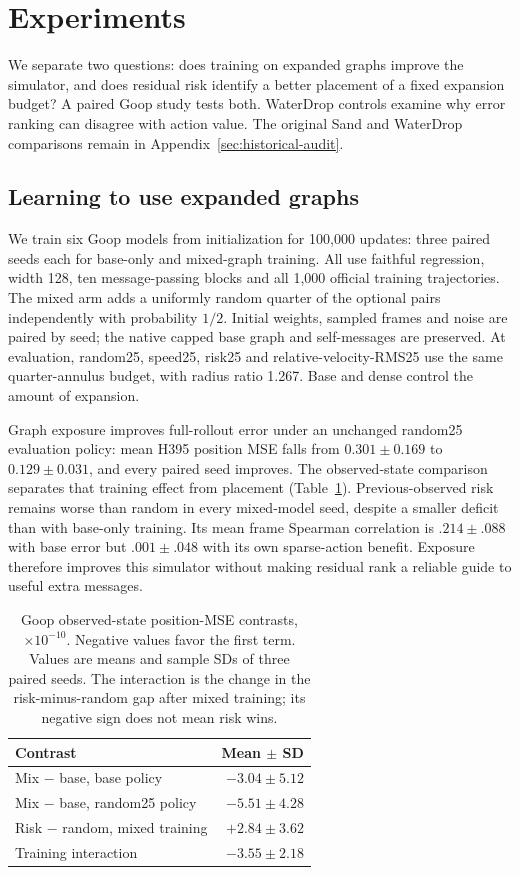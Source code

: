 \section{Experiments}
We separate two questions: does training on expanded graphs improve the simulator, and does residual risk identify a better placement of a fixed expansion budget? A paired Goop study tests both. WaterDrop controls examine why error ranking can disagree with action value. The original Sand and WaterDrop comparisons remain in Appendix~\ref{sec:historical-audit}.

\subsection{Learning to use expanded graphs}
We train six Goop models from initialization for 100,000 updates: three paired seeds each for base-only and mixed-graph training. All use faithful regression, width 128, ten message-passing blocks and all 1,000 official training trajectories. The mixed arm adds a uniformly random quarter of the optional pairs independently with probability $1/2$. Initial weights, sampled frames and noise are paired by seed; the native capped base graph and self-messages are preserved. At evaluation, random25, speed25, risk25 and relative-velocity-RMS25 use the same quarter-annulus budget, with radius ratio 1.267. Base and dense control the amount of expansion.

Graph exposure improves full-rollout error under an unchanged random25 evaluation policy: mean H395 position MSE falls from $0.301\pm0.169$ to $0.129\pm0.031$, and every paired seed improves. The observed-state comparison separates that training effect from placement (Table~\ref{tab:goop-exposure-placement}). Previous-observed risk remains worse than random in every mixed-model seed, despite a smaller deficit than with base-only training. Its mean frame Spearman correlation is $.214\pm.088$ with base error but $.001\pm.048$ with its own sparse-action benefit. Exposure therefore improves this simulator without making residual rank a reliable guide to useful extra messages.

\begin{table}[t]
\centering\small
\caption{Goop observed-state position-MSE contrasts, $\times10^{-10}$. Negative values favor the first term. Values are means and sample SDs of three paired seeds. The interaction is the change in the risk-minus-random gap after mixed training; its negative sign does not mean risk wins.}
\label{tab:goop-exposure-placement}
\begin{tabular}{lr}
\toprule
Contrast & Mean $\pm$ SD\\
\midrule
Mix $-$ base, base policy & $-3.04\pm5.12$\\
Mix $-$ base, random25 policy & $-5.51\pm4.28$\\
Risk $-$ random, mixed training & $+2.84\pm3.62$\\
Training interaction & $-3.55\pm2.18$\\
\bottomrule
\end{tabular}
\end{table}

